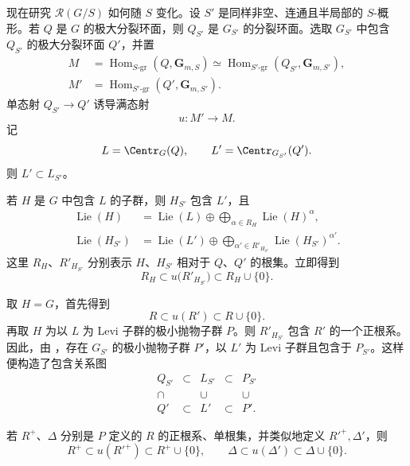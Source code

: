 

现在研究 \(\mathcal R(G/S)\) 如何随 \(S\) 变化。设 \(S'\) 是同样非空、连通且半局部的 \(S\)-概形。若 \(Q\) 是 \(G\) 的极大分裂环面，则 \(Q_{S'}\) 是 \(G_{S'}\) 的分裂环面。选取 \(G_{S'}\) 中包含 \(Q_{S'}\) 的极大分裂环面 \(Q'\)，并置
\[
\begin{aligned}
 M&=\operatorname{Hom}_{S\text{-}\mathrm{gr}}
       (Q,\mathbf G_{m,S})
   \simeq
   \operatorname{Hom}_{S'\text{-}\mathrm{gr}}
       (Q_{S'},\mathbf G_{m,S'}),\\
 M'&=\operatorname{Hom}_{S'\text{-}\mathrm{gr}}
       (Q',\mathbf G_{m,S'}).
\end{aligned}
\]
单态射 \(Q_{S'}\to Q'\) 诱导满态射
\[
 u:M'\longrightarrow M.
\]
记
\[
 L=\Centr_G(Q),\qquad L'=\Centr_{G_{S'}}(Q').
\]
则 \(L'\subset L_{S'}\)。

若 \(H\) 是 \(G\) 中包含 \(L\) 的子群，则 \(H_{S'}\) 包含 \(L'\)，且
\[
\begin{aligned}
 \operatorname{Lie}(H)
  &=\operatorname{Lie}(L)
    \oplus\bigoplus_{\alpha\in R_H}
       \operatorname{Lie}(H)^\alpha,\\
 \operatorname{Lie}(H_{S'})
  &=\operatorname{Lie}(L')
    \oplus\bigoplus_{\alpha'\in R'_{H_{S'}}}
       \operatorname{Lie}(H_{S'})^{\alpha'}.
\end{aligned}
\]
这里 \(R_H\)、\(R'_{H_{S'}}\) 分别表示 \(H\)、\(H_{S'}\) 相对于 \(Q\)、\(Q'\) 的根集。立即得到
\[
 R_H\subset u\bigl(R'_{H_{S'}}\bigr)
       \subset R_H\cup\{0\}.
\]

取 \(H=G\)，首先得到
\[
 R\subset u(R')\subset R\cup\{0\}.
\]
再取 \(H\) 为以 \(L\) 为 Levi 子群的极小抛物子群 \(P\)。则 \(R'_{H_{S'}}\) 包含 \(R'\) 的一个正根系。因此，由 ，存在 \(G_{S'}\) 的极小抛物子群 \(P'\)，以 \(L'\) 为 Levi 子群且包含于 \(P_{S'}\)。这样便构造了包含关系图
\[
\begin{array}{ccccc}
 Q_{S'} & \subset & L_{S'} & \subset & P_{S'}\\[1.2ex]
 \cap   &         & \cup   &         & \cup\\[1.2ex]
 Q'     & \subset & L'     & \subset & P'.
\end{array}
\]

若 \(R^+\)、\(\Delta\) 分别是 \(P\) 定义的 \(R\) 的正根系、单根集，并类似地定义 \(R'^+,\Delta'\)，则
\[
 R^+\subset u(R'^+)\subset R^+\cup\{0\},
 \qquad
 \Delta\subset u(\Delta')\subset\Delta\cup\{0\}.
\]

